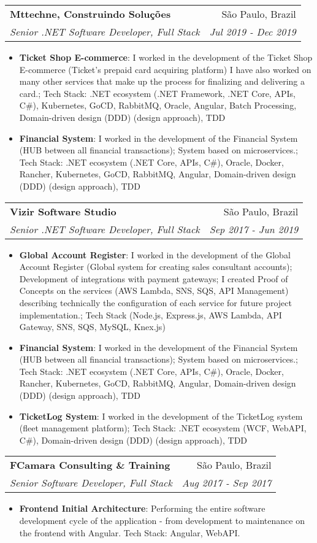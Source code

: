\documentclass[letterpaper,11pt]{article}
\makeatletter
\newcommand{\resumeItem}[2]{
  \item\small{
    \textbf{#1}{: #2 \vspace{-2pt}}
  }
}
\newcommand{\resumeSubheading}[4]{
  \vspace{-1pt}\item
    \begin{tabular*}{0.97\textwidth}[t]{l@{\extracolsep{\fill}}r}
      \textbf{#1} & #2 \\
      \textit{\small#3} & \textit{\small #4} \\
    \end{tabular*}\vspace{-5pt}
}
\newcommand{\resumeItemListStart}{\begin{itemize}}
\newcommand{\resumeItemListEnd}{\end{itemize}\vspace{-5pt}}
\makeatother
\begin{document}
    \resumeSubheading
    {Mttechne, Construindo Soluções}{São Paulo, Brazil}
    {Senior .NET Software Developer, Full Stack}{Jul 2019 - Dec 2019}
    \resumeItemListStart
      \resumeItem{Ticket Shop E-commerce}
        {I worked in the development of the Ticket Shop E-commerce (Ticket's prepaid card acquiring platform)
        I have also worked on many other services that make up the process for finalizing and delivering a card.;
        Tech Stack: .NET ecosystem (.NET Framework, .NET Core, APIs, C\#), Kubernetes, GoCD, RabbitMQ, Oracle, Angular, Batch Processing, Domain-driven design (DDD) (design approach), TDD}
      \resumeItem{Financial System}
        {I worked in the development of the Financial System (HUB between all financial transactions);
        System based on microservices.;
        Tech Stack: .NET ecosystem (.NET Core, APIs, C\#), Oracle, Docker, Rancher, Kubernetes, GoCD, RabbitMQ, Angular, Domain-driven design (DDD) (design approach), TDD}
    \resumeItemListEnd

    \resumeSubheading
    {Vizir Software Studio}{São Paulo, Brazil}
    {Senior .NET Software Developer, Full Stack}{Sep 2017 - Jun 2019}
    \resumeItemListStart
      \resumeItem{Global Account Register}
        {I worked in the development of the Global Account Register (Global system for creating sales consultant accounts); 
        Development of integrations with payment gateways; I created Proof of Concepts on the services (AWS Lambda, SNS, SQS, API Management) describing technically the configuration of each service for future project implementation.;
        Tech Stack (Node.js, Express.js, AWS Lambda, API Gateway, SNS, SQS, MySQL, Knex.js)}
      \resumeItem{Financial System}
        {I worked in the development of the Financial System (HUB between all financial transactions);
        System based on microservices.;
        Tech Stack: .NET ecosystem (.NET Core, APIs, C\#), Oracle, Docker, Rancher, Kubernetes, GoCD, RabbitMQ, Angular, Domain-driven design (DDD) (design approach), TDD}
      \resumeItem{TicketLog System}
        {I worked in the development of the TicketLog system (fleet management platform);
        Tech Stack: .NET ecosystem (WCF, WebAPI, C\#), Domain-driven design (DDD) (design approach), TDD}
    \resumeItemListEnd

    \resumeSubheading
    {FCamara Consulting \& Training}{São Paulo, Brazil}
    {Senior Software Developer, Full Stack}{Aug 2017 - Sep 2017}
    \resumeItemListStart
      \resumeItem{Frontend Initial Architecture}
        {Performing the entire software development cycle of the application - from development to maintenance on the frontend with Angular. Tech Stack: Angular, WebAPI.}
    \resumeItemListEnd
\end{document}
